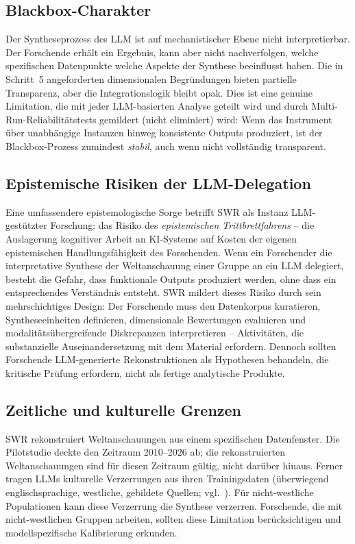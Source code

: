 \documentclass[11pt,a4paper]{article}
\begin{document}
\subsection{Blackbox-Charakter}
\label{sec:limitations:blackbox}

Der Syntheseprozess des LLM ist auf mechanistischer Ebene nicht interpretierbar. Der Forschende erhält ein Ergebnis, kann aber nicht nachverfolgen, welche spezifischen Datenpunkte welche Aspekte der Synthese beeinflusst haben. Die in Schritt~5 angeforderten dimensionalen Begründungen bieten partielle Transparenz, aber die Integrationslogik bleibt opak. Dies ist eine genuine Limitation, die mit jeder LLM-basierten Analyse geteilt wird und durch Multi-Run-Reliabilitätstests gemildert (nicht eliminiert) wird: Wenn das Instrument über unabhängige Instanzen hinweg konsistente Outputs produziert, ist der Blackbox-Prozess zumindest \emph{stabil}, auch wenn nicht vollständig transparent.


\subsection{Epistemische Risiken der LLM-Delegation}
\label{sec:limitations:epistemic}

Eine umfassendere epistemologische Sorge betrifft SWR als Instanz LLM-gestützter Forschung: das Risiko des \emph{epistemischen Trittbrettfahrens} -- die Auslagerung kognitiver Arbeit an KI-Systeme auf Kosten der eigenen epistemischen Handlungsfähigkeit des Forschenden. Wenn ein Forschender die interpretative Synthese der Weltanschauung einer Gruppe an ein LLM delegiert, besteht die Gefahr, dass funktionale Outputs produziert werden, ohne dass ein entsprechendes Verständnis entsteht. SWR mildert dieses Risiko durch sein mehrschichtiges Design: Der Forschende muss den Datenkorpus kuratieren, Syntheseeinheiten definieren, dimensionale Bewertungen evaluieren und modalitätsübergreifende Diskrepanzen interpretieren -- Aktivitäten, die substanzielle Auseinandersetzung mit dem Material erfordern. Dennoch sollten Forschende LLM-generierte Rekonstruktionen als Hypothesen behandeln, die kritische Prüfung erfordern, nicht als fertige analytische Produkte.


\subsection{Zeitliche und kulturelle Grenzen}
\label{sec:limitations:temporal}

SWR rekonstruiert Weltanschauungen aus einem spezifischen Datenfenster. Die Pilotstudie deckte den Zeitraum 2010--2026 ab; die rekonstruierten Weltanschauungen sind für diesen Zeitraum gültig, nicht darüber hinaus. Ferner tragen LLMs kulturelle Verzerrungen aus ihren Trainingsdaten (überwiegend englischsprachige, westliche, gebildete Quellen; vgl.\ \citealp{Santurkar2023}). Für nicht-westliche Populationen kann diese Verzerrung die Synthese verzerren. Forschende, die mit nicht-westlichen Gruppen arbeiten, sollten diese Limitation berücksichtigen und modellspezifische Kalibrierung erkunden.
\end{document}
